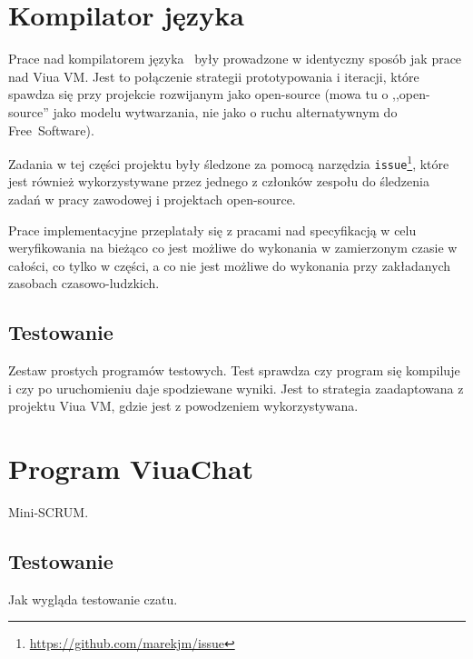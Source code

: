 \section{Kompilator języka \ViuAct}

Prace nad kompilatorem języka \ViuAct\ były prowadzone w identyczny sposób jak prace nad Viua VM.
Jest to połączenie strategii prototypowania i iteracji, które spawdza się przy projekcie rozwijanym jako
open-source (mowa tu o ,,open-source'' jako modelu wytwarzania, nie jako o ruchu alternatywnym do
Free~Software).

Zadania w tej części projektu były śledzone za pomocą narzędzia
\texttt{issue}\footnote{\url{https://github.com/marekjm/issue}}, które jest również wykorzystywane przez
jednego z członków zespołu do śledzenia zadań w pracy zawodowej i projektach open-source.

Prace implementacyjne przeplatały się z pracami nad specyfikacją w celu weryfikowania na bieżąco co jest
możliwe do wykonania w zamierzonym czasie w całości, co tylko w części, a co nie jest możliwe do wykonania
przy zakładanych zasobach czasowo-ludzkich.

\subsection{Testowanie}

Zestaw prostych programów testowych. Test sprawdza czy program się kompiluje i czy po uruchomieniu daje
spodziewane wyniki. Jest to strategia zaadaptowana z projektu Viua VM, gdzie jest z powodzeniem
wykorzystywana.

\section{Program ViuaChat}

Mini-SCRUM.

\subsection{Testowanie}

Jak wygląda testowanie czatu.
